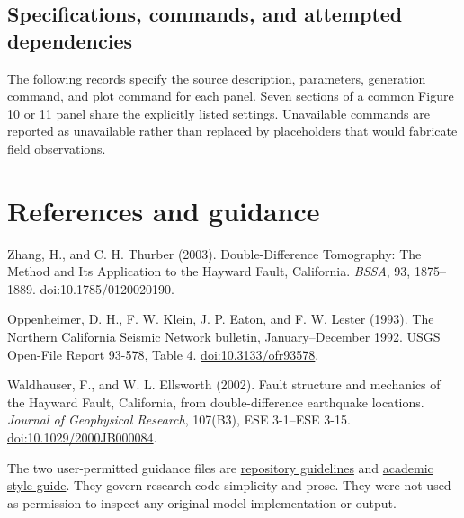 \documentclass[11pt]{article}
\begin{document}
\subsection{Specifications, commands, and attempted dependencies}
The following records specify the source description, parameters, generation
command, and plot command for each panel. Seven sections of a common
Figure 10 or 11 panel share the explicitly listed settings. Unavailable
commands are reported as unavailable rather than replaced by placeholders
that would fabricate field observations.


\section{References and guidance}
Zhang, H., and C. H. Thurber (2003). Double-Difference Tomography: The Method
and Its Application to the Hayward Fault, California. \emph{BSSA}, 93,
1875--1889. doi:10.1785/0120020190.

Oppenheimer, D. H., F. W. Klein, J. P. Eaton, and F. W. Lester (1993).
The Northern California Seismic Network bulletin, January--December 1992.
USGS Open-File Report 93-578, Table 4.
\href{https://doi.org/10.3133/ofr93578}{doi:10.3133/ofr93578}.

Waldhauser, F., and W. L. Ellsworth (2002). Fault structure and mechanics of
the Hayward Fault, California, from double-difference earthquake locations.
\emph{Journal of Geophysical
Research}, 107(B3), ESE 3-1--ESE 3-15.
\href{https://doi.org/10.1029/2000JB000084}{doi:10.1029/2000JB000084}.

The two user-permitted guidance files are
\href{https://github.com/bradlipovsky/vdv-damage/blob/main/AGENTS.md}{repository guidelines}
and
\href{https://github.com/bradlipovsky/vdv-damage/blob/main/brad-lipovsky-academic-style-guide.md}{academic style guide}.
They govern research-code simplicity and prose. They were not used as
permission to inspect any original model implementation or output.
\end{document}
